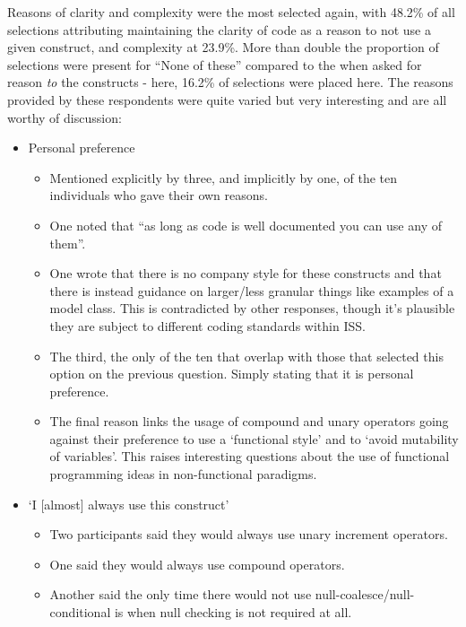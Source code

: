 \documentclass{article}
\begin{document}
            Reasons of clarity and complexity were the most selected again, with 48.2\% of all selections attributing maintaining the clarity of code as a reason to not use a given construct, and complexity at 23.9\%. More than double the proportion of selections were present for ``None of these'' compared to the when asked for reason \emph{to} the constructs - here, 16.2\% of selections were placed here. The reasons provided by these respondents were quite varied but very interesting and are all worthy of discussion:

            \begin{itemize}
                \item Personal preference
                \begin{itemize}
                    \item Mentioned explicitly by three, and implicitly by one, of the ten individuals who gave their own reasons.
                    \item One noted that ``as long as code is well documented you can use any of them''.
                    \item One wrote that there is no company style for these constructs and that there is instead guidance on larger/less granular things like examples of a model class. This is contradicted by other responses, though it's plausible they are subject to different coding standards within ISS.
                    \item The third, the only of the ten that overlap with those that selected this option on the previous question. Simply stating that it is personal preference.
                    \item The final reason links the usage of compound and unary operators going against their preference to use a `functional style' and to `avoid mutability of variables'. This raises interesting questions about the use of functional programming ideas in non-functional paradigms.
                \end{itemize}
                \item `I [almost] always use this construct'
                \begin{itemize}
                    \item Two participants said they would always use unary increment operators.
                    \item One said they would always use compound operators.
                    \item Another said the only time there would not use null-coalesce/null-conditional is when null checking is not required at all.

\end{itemize}
\end{itemize}
\end{document}
